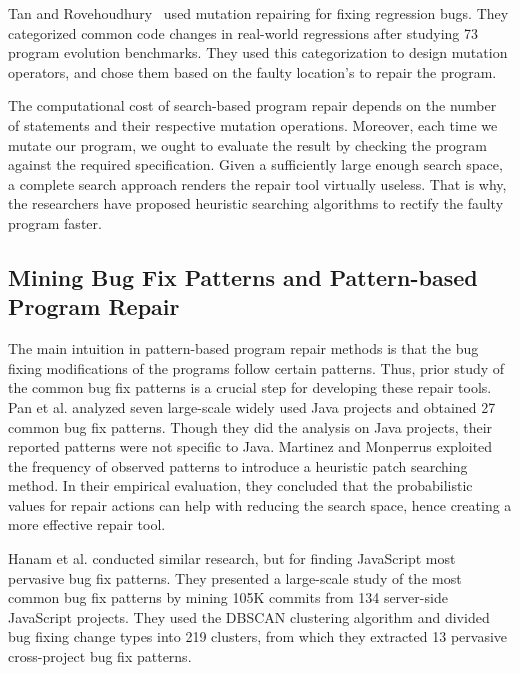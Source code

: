 Tan and Rovehoudhury~\cite{tan2015relifix} used mutation repairing for fixing regression bugs. They categorized common code changes in real-world regressions after studying 73 program evolution benchmarks. They used this categorization to design mutation operators, and chose them based on the faulty location’s to repair the program.




The computational cost of search-based program repair depends on the number of statements and their respective mutation operations. Moreover, each time we mutate our program, we ought to evaluate the result by checking the program against the required specification. Given a sufficiently large enough search space, a complete search approach renders the repair tool virtually useless. That is why, the researchers have proposed heuristic searching algorithms to rectify the faulty program faster.

\subsection{Mining Bug Fix Patterns and Pattern-based Program Repair}

The main intuition in pattern-based program repair methods is that the bug fixing modifications of the programs follow certain patterns. Thus, prior study of the common bug fix patterns is a crucial step for developing these repair tools. Pan et al. \cite{pan2009toward} analyzed seven large-scale widely used Java projects and obtained 27 common bug fix patterns. Though they did the analysis on Java projects, their reported patterns were not specific to Java. Martinez and Monperrus \cite{martinez2015mining} \cite{martinez2012mining} exploited the frequency of observed patterns to introduce a heuristic patch searching method. In their empirical evaluation, they concluded that the probabilistic values for repair actions can help with reducing the search space, hence creating a more effective repair tool.

Hanam et al. \cite{hanam2016discovering} conducted similar research, but for finding JavaScript most pervasive bug fix patterns. They presented a large-scale study of the most common bug fix patterns by mining 105K commits from 134 server-side JavaScript projects. They used the DBSCAN clustering algorithm and divided bug fixing change types into 219 clusters, from which they extracted 13 pervasive cross-project bug fix patterns. 


